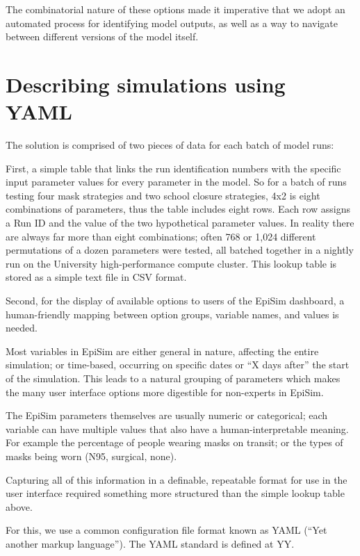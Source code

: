 The combinatorial nature of these options made it imperative that we
adopt an automated process for identifying model outputs, as well as a
way to navigate between different versions of the model itself.

\hypertarget{describing-simulations-using-yaml}{%
\section{Describing simulations using
YAML}\label{describing-simulations-using-yaml}}

The solution is comprised of two pieces of data for each batch of model
runs:

First, a simple table that links the run identification numbers with the
specific input parameter values for every parameter in the model. So for
a batch of runs testing four mask strategies and two school closure
strategies, 4x2 is eight combinations of parameters, thus the table
includes eight rows. Each row assigns a Run ID and the value of the two
hypothetical parameter values. In reality there are always far more than
eight combinations; often 768 or 1,024 different permutations of a dozen
parameters were tested, all batched together in a nightly run on the
University high-performance compute cluster. This lookup table is stored
as a simple text file in CSV format.

Second, for the display of available options to users of the EpiSim
dashboard, a human-friendly mapping between option groups, variable
names, and values is needed.

Most variables in EpiSim are either general in nature, affecting the
entire simulation; or time-based, occurring on specific dates or ``X
days after'' the start of the simulation. This leads to a natural
grouping of parameters which makes the many user interface options more
digestible for non-experts in EpiSim.

The EpiSim parameters themselves are usually numeric or categorical;
each variable can have multiple values that also have a
human-interpretable meaning. For example the percentage of people
wearing masks on transit; or the types of masks being worn (N95,
surgical, none).

Capturing all of this information in a definable, repeatable format for
use in the user interface required something more structured than the
simple lookup table above.

For this, we use a common configuration file format known as YAML (``Yet
another markup language''). The YAML standard is defined at YY.

